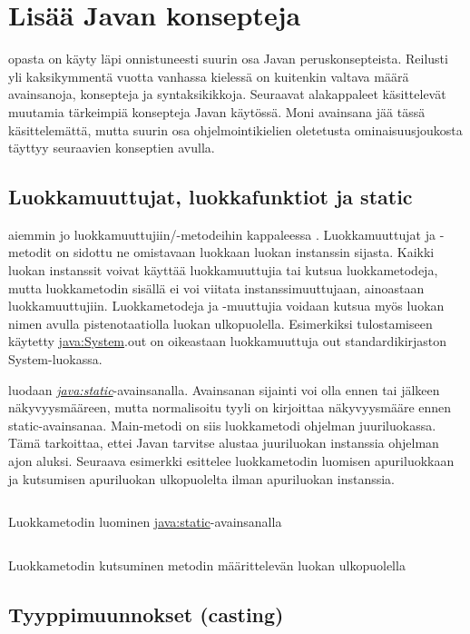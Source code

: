 \documentclass{tufte-book}
\newcommand{\java}[1]{\underline{\gls{java:#1}}}
\newcommand{\newjava}[1]{\textit{\java{#1}}}
\newcommand{\code}[3]{
\begin{listing}
    \inputminted{java}{OhjelmointiopasEsimerkit/src/#1/#2.java}
    \caption{#3}
    \label{Java-#1-#2}
\end{listing}
}
\begin{document}
\section{Lisää Javan konsepteja}
\label{loput perusteet}

 opasta on käyty läpi onnistuneesti suurin osa Javan
peruskonsepteista. Reilusti yli kaksikymmentä vuotta vanhassa kielessä on kuitenkin valtava määrä
avainsanoja, konsepteja ja syntaksikikkoja. Seuraavat alakappaleet käsittelevät muutamia
tärkeimpiä konsepteja Javan käytössä. Moni avainsana jää tässä käsittelemättä, mutta suurin osa
ohjelmointikielien oletetusta ominaisuusjoukosta täyttyy seuraavien konseptien avulla.

\subsection{Luokkamuuttujat, luokkafunktiot ja static}
\label{static}

 aiemmin jo luokkamuuttujiin/-metodeihin kappaleessa
. Luokkamuuttujat ja -metodit on sidottu ne omistavaan luokkaan luokan instanssin
sijasta. Kaikki luokan instanssit voivat käyttää luokkamuuttujia tai kutsua luokkametodeja, mutta
luokkametodin sisällä ei voi viitata instanssimuuttujaan, ainoastaan luokkamuuttujiin.
Luokkametodeja ja -muuttujia voidaan kutsua myös luokan nimen avulla pistenotaatiolla luokan
ulkopuolella. Esimerkiksi tulostamiseen käytetty \java{System}.out on oikeastaan luokkamuuttuja
out standardikirjaston System-luokassa.

 luodaan \newjava{static}-avainsanalla. Avainsanan
sijainti voi olla ennen tai jälkeen näkyvyysmääreen, mutta normalisoitu tyyli on kirjoittaa
näkyvyysmääre ennen static-avainsanaa. Main-metodi on siis luokkametodi ohjelman juuriluokassa.
Tämä tarkoittaa, ettei Javan tarvitse alustaa juuriluokan instanssia ohjelman ajon aluksi.
Seuraava esimerkki esittelee luokkametodin luomisen apuriluokkaan ja kutsumisen apuriluokan
ulkopuolelta ilman apuriluokan instanssia.

\code{week3}{BasicStaticChild}{Luokkametodin luominen \java{static}-avainsanalla}
\code{week3}{BasicStatic}{Luokkametodin kutsuminen metodin määrittelevän luokan ulkopuolella}

\subsection{Tyyppimuunnokset (casting)}
\label{casting}
\end{document}

